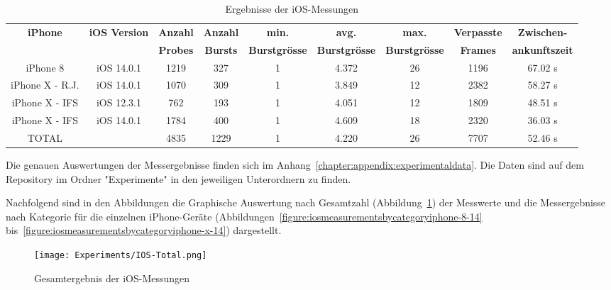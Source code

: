 \begin{landscape}
    \begin{table}[h!]
	    \centering
        \begin{tabular}{|c|c|c|c|c|c|c|c|c|}
            \hline
            \textbf{iPhone} & \textbf{iOS Version} & \textbf{Anzahl} & \textbf{Anzahl} & \textbf{min.} & \textbf{avg.} & \textbf{max.} & \textbf{Verpasste} & \textbf{Zwischen-}\\
             & & \textbf{Probes} & \textbf{Bursts} & \textbf{Burstgrösse} & \textbf{Burstgrösse} & \textbf{Burstgrösse} & \textbf{Frames} & \textbf{ankunftszeit}\\
            \hline
            iPhone 8 & iOS 14.0.1 & 1219 & \phantom{0}327 & 1 & 4.372 & 26 & 1196 & 67.02 s \\
            \hline 
            iPhone X - R.J. & iOS 14.0.1 & 1070 & \phantom{0}309 & 1 & 3.849 & 12 & 2382 & 58.27 s \\
            \hline 
            iPhone X - IFS & iOS 12.3.1 & \phantom{0}762 & \phantom{0}193 & 1 & 4.051 & 12 & 1809 & 48.51 s \\
            \hline
            iPhone X - IFS & iOS 14.0.1 & 1784 & \phantom{0}400 & 1 & 4.609 & 18 & 2320 & 36.03 s \\
            \hline
            TOTAL & & 4835 & 1229 & 1 & 4.220 & 26 & 7707 & 52.46 s \\
            \hline
        \end{tabular}
        \caption{Ergebnisse der iOS-Messungen
        \label{table:iosproberesults}}  
    \end{table}
    Die genauen Auswertungen der Messergebnisse finden sich im 
    Anhang~\ref{chapter:appendix:experimentaldata}. 
    Die Daten sind auf dem Repository im Ordner "Experimente" in den jeweiligen Unterordnern
    zu finden.
    
    Nachfolgend sind in den Abbildungen die Graphische Auswertung nach Gesamtzahl 
    (Abbildung~\ref{figure:totaliosmeasurements}) der Messwerte und die Messergebnisse nach Kategorie für 
    die einzelnen iPhone-Geräte (Abbildungen~\ref{figure:iosmeasurementsbycategoryiphone-8-14} 
    bis~\ref{figure:iosmeasurementsbycategoryiphone-x-14}) dargestellt.

    \begin{figure}[h!]
        \centering
        \texttt{[image: Experiments/IOS-Total.png]}
        \caption{Gesamtergebnis der iOS-Messungen}
        \label{figure:totaliosmeasurements}
    \end{figure}
\end{landscape}

